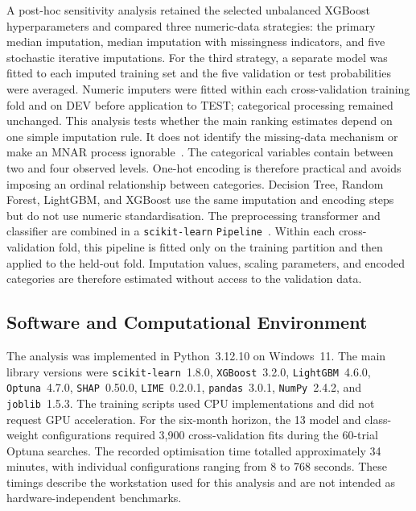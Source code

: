 A post-hoc sensitivity analysis retained the selected unbalanced XGBoost hyperparameters and compared three numeric-data strategies: the primary median imputation, median imputation with missingness indicators, and five stochastic iterative imputations. For the third strategy, a separate model was fitted to each imputed training set and the five validation or test probabilities were averaged. Numeric imputers were fitted within each cross-validation training fold and on \gls{DEV} before application to \gls{TEST}; categorical processing remained unchanged. This analysis tests whether the main ranking estimates depend on one simple imputation rule. It does not identify the missing-data mechanism or make an \gls{MNAR} process ignorable~\cite{white2011mice,sterne2009multiple}.
The categorical variables contain between two and four observed levels. One-hot encoding is therefore practical and avoids imposing an ordinal relationship between categories. Decision Tree, Random Forest, LightGBM, and XGBoost use the same imputation and encoding steps but do not use numeric standardisation.
The preprocessing transformer and classifier are combined in a \texttt{scikit-learn} \texttt{Pipeline}~\cite{pedregosa2011scikit}. Within each cross-validation fold, this pipeline is fitted only on the training partition and then applied to the held-out fold. Imputation values, scaling parameters, and encoded categories are therefore estimated without access to the validation data.

\subsection{Software and Computational Environment}
\label{sec:methods_environment}
The analysis was implemented in Python~3.12.10 on Windows~11. The main library versions were \texttt{scikit-learn}~1.8.0, \texttt{XGBoost}~3.2.0, \texttt{LightGBM}~4.6.0, \texttt{Optuna}~4.7.0, \texttt{SHAP}~0.50.0, \texttt{LIME}~0.2.0.1, \texttt{pandas}~3.0.1, \texttt{NumPy}~2.4.2, and \texttt{joblib}~1.5.3. The training scripts used \gls{CPU} implementations and did not request \gls{GPU} acceleration.
For the six-month horizon, the 13 model and class-weight configurations required 3,900 cross-validation fits during the 60-trial Optuna searches. The recorded optimisation time totalled approximately 34 minutes, with individual configurations ranging from 8 to 768 seconds. These timings describe the workstation used for this analysis and are not intended as hardware-independent benchmarks.

